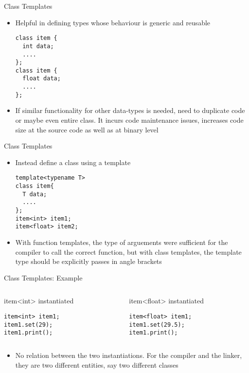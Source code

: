 \documentclass{beamer}
\begin{document}
\begin{frame}[fragile]{Class Templates}
  \begin{itemize}
  \item Helpful in defining types whose behaviour is generic and reusable\pause
    \begin{lstlisting}
class item {
  int data;
  ....
};
class item {
  float data;
  ....
};
    \end{lstlisting}\pause
  \item If similar functionality for other data-types is needed, need to duplicate code or maybe even entire class. It incurs code maintenance issues, increases code size at the source code as well as at binary level
  \end{itemize}
\end{frame}

\begin{frame}[fragile]{Class Templates}
  \begin{itemize}
  \item Instead define a class using a template\pause
    \begin{lstlisting}
template<typename T>
class item{
  T data;
  ....
};
item<int> item1;
item<float> item2;
    \end{lstlisting}\pause
  \item With function templates, the type of arguements were sufficient for the compiler to call the correct function, but with class templates, the template type should be explicitly passes in angle brackets
  \end{itemize}
\end{frame}

\begin{frame}[fragile]{Class Templates: Example}
  \begin{columns}
    \begin{column}{0.4\textwidth}
item<int> instantiated
      \begin{lstlisting}
item<int> item1;
item1.set(29);
item1.print();
      \end{lstlisting}\pause
    \end{column}
    \begin{column}{0.4\textwidth}
item<float> instantiated
      \begin{lstlisting}
item<float> item1;
item1.set(29.5);
item1.print();
      \end{lstlisting}\pause
    \end{column}
  \end{columns}
  \begin{itemize}
  \item No relation between the two instantiations. For the compiler and the linker, they are two different entities, say two different classes
  \end{itemize}
\end{frame}
\end{document}
